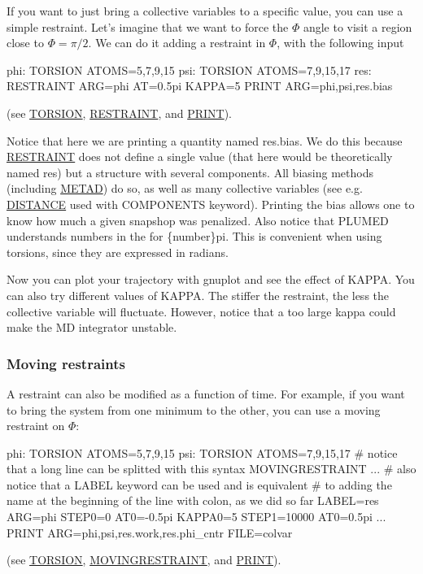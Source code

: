 If you want to just bring a collective variables to a specific value, you can use a simple restraint. Let's imagine that we want to force the $\Phi$ angle to visit a region close to $\Phi=\pi/2$. We can do it adding a restraint in $\Phi$, with the following input \begin{DoxyVerb}phi: TORSION ATOMS=5,7,9,15
psi: TORSION ATOMS=7,9,15,17
res: RESTRAINT ARG=phi AT=0.5pi KAPPA=5
PRINT ARG=phi,psi,res.bias
\end{DoxyVerb}
 (see \hyperlink{TORSION}{T\+O\+R\+S\+I\+O\+N}, \hyperlink{RESTRAINT}{R\+E\+S\+T\+R\+A\+I\+N\+T}, and \hyperlink{PRINT}{P\+R\+I\+N\+T}).

Notice that here we are printing a quantity named {\ttfamily res.\+bias}. We do this because \hyperlink{RESTRAINT}{R\+E\+S\+T\+R\+A\+I\+N\+T} does not define a single value (that here would be theoretically named {\ttfamily res}) but a structure with several components. All biasing methods (including \hyperlink{METAD}{M\+E\+T\+A\+D}) do so, as well as many collective variables (see e.\+g. \hyperlink{DISTANCE}{D\+I\+S\+T\+A\+N\+C\+E} used with C\+O\+M\+P\+O\+N\+E\+N\+T\+S keyword). Printing the bias allows one to know how much a given snapshop was penalized. Also notice that P\+L\+U\+M\+E\+D understands numbers in the for {\ttfamily \{number\}pi}. This is convenient when using torsions, since they are expressed in radians.

Now you can plot your trajectory with gnuplot and see the effect of K\+A\+P\+P\+A. You can also try different values of K\+A\+P\+P\+A. The stiffer the restraint, the less the collective variable will fluctuate. However, notice that a too large kappa could make the M\+D integrator unstable.

 \hypertarget{munster_munster-biasing-moving}{}\subsubsection{Moving restraints}\label{munster_munster-biasing-moving}
A restraint can also be modified as a function of time. For example, if you want to bring the system from one minimum to the other, you can use a moving restraint on $\Phi$\+: \begin{DoxyVerb}phi: TORSION ATOMS=5,7,9,15
psi: TORSION ATOMS=7,9,15,17
# notice that a long line can be splitted with this syntax
MOVINGRESTRAINT ...
# also notice that a LABEL keyword can be used and is equivalent
# to adding the name at the beginning of the line with colon, as we did so far
  LABEL=res
  ARG=phi
  STEP0=0 AT0=-0.5pi KAPPA0=5
  STEP1=10000 AT0=0.5pi 
...
PRINT ARG=phi,psi,res.work,res.phi_cntr FILE=colvar
\end{DoxyVerb}
 (see \hyperlink{TORSION}{T\+O\+R\+S\+I\+O\+N}, \hyperlink{MOVINGRESTRAINT}{M\+O\+V\+I\+N\+G\+R\+E\+S\+T\+R\+A\+I\+N\+T}, and \hyperlink{PRINT}{P\+R\+I\+N\+T}).

